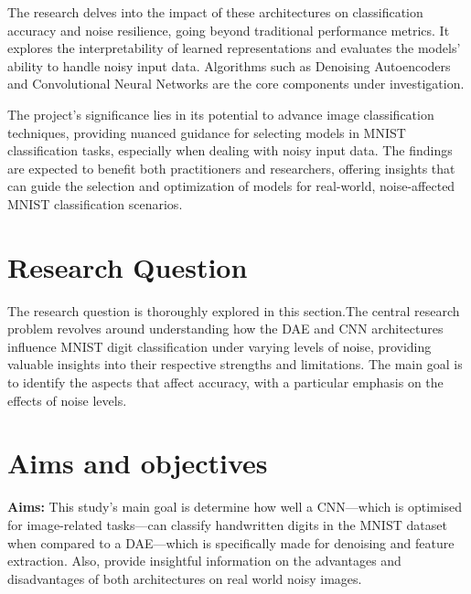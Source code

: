 The research delves into the impact of these architectures on classification accuracy and noise resilience, going beyond traditional performance metrics. It explores the interpretability of learned representations and evaluates the models' ability to handle noisy input data. Algorithms such as Denoising Autoencoders and Convolutional Neural Networks are the core components under investigation.

The project's significance lies in its potential to advance image classification techniques, providing nuanced guidance for selecting models in MNIST classification tasks, especially when dealing with noisy input data. The findings are expected to benefit both practitioners and researchers, offering insights that can guide the selection and optimization of models for real-world, noise-affected MNIST classification scenarios.

\section{Research Question}
\label{sec:intro_prob_art}
The research question is thoroughly explored in this section.The central research problem revolves around understanding how the DAE and CNN architectures influence MNIST digit classification under varying levels of noise, providing valuable insights into their respective strengths and limitations. The main goal is to identify the aspects that affect accuracy, with a particular emphasis on the effects of noise levels.

\section{Aims and objectives}
\label{sec:intro_aims_obj}


\textbf{Aims:} This study's main goal is determine how well a CNN—which is optimised for image-related tasks—can classify handwritten digits in the MNIST dataset when compared to a DAE—which is specifically made for denoising and feature extraction. Also, provide insightful information on the advantages and disadvantages of both architectures on real world noisy images.

